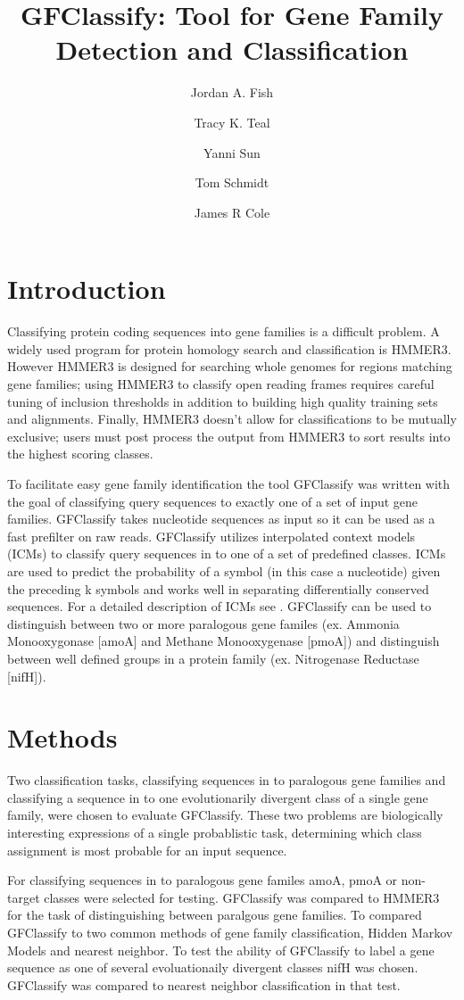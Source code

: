 \documentclass{article}
\title{GFClassify: Tool for Gene Family Detection and Classification}
\author{Jordan A. Fish \and Tracy K. Teal \and Yanni Sun \and Tom Schmidt \and James R Cole}
\begin{document}
\maketitle
\section{Introduction}
Classifying protein coding sequences into gene families is a difficult problem.  A widely used program for protein homology search and classification is HMMER3\cite{hmmer3}.  However HMMER3 is designed for searching whole genomes for regions matching gene families; using HMMER3 to classify open reading frames requires careful tuning of inclusion thresholds in addition to building high quality training sets and alignments.  Finally, HMMER3 doesn't allow for classifications to be mutually exclusive; users must post process the output from HMMER3 to sort results into the highest scoring classes.

To facilitate easy gene family identification the tool GFClassify was written with the goal of classifying query sequences to exactly one of a set of input gene families.  GFClassify takes nucleotide sequences as input so it can be used as a fast prefilter on raw reads.  GFClassify utilizes interpolated context models\cite{glimmer2} (ICMs) to classify query sequences in to one of a set of predefined classes.  ICMs are used to predict the probability of a symbol (in this case a nucleotide) given the preceding k symbols and works well in separating differentially conserved sequences.  For a detailed description of ICMs see \cite{glimmer1} \cite{glimmer2}.  GFClassify can be used to distinguish between two or more paralogous gene familes (ex. Ammonia Monooxygonase [amoA] and Methane Monooxygenase [pmoA]) and distinguish between well defined groups in a protein family (ex. Nitrogenase Reductase [nifH]).

\section{Methods}
Two classification tasks, classifying sequences in to paralogous gene families and classifying a sequence in to one evolutionarily divergent class of a single gene family, were chosen to evaluate GFClassify.  These two problems are biologically interesting expressions of a single probablistic task, determining which class assignment is most probable for an input sequence. 

For classifying sequences in to paralogous gene familes amoA, pmoA or non-target classes were selected for testing. GFClassify was compared to HMMER3 for the task of distinguishing between paralgous gene families.  To compared GFClassify to two common methods of gene family classification, Hidden Markov Models and nearest neighbor.  To test the ability of GFClassify to label a gene sequence as one of several evoluationaily divergent classes nifH was chosen. GFClassify was compared to nearest neighbor classification in that test.
\end{document}
